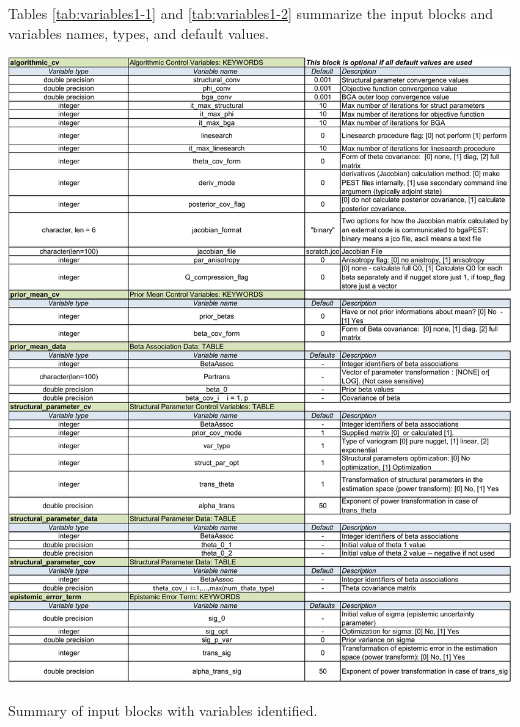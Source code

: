 \documentclass[11pt,oneside,onecolumn]{usgsreport}
\begin{document}
\begin{appendix}
\begin{bibunit}
Tables \ref{tab:variables1-1} and \ref{tab:variables1-2} summarize the input blocks and variables
names, types, and default values.

\begin{table}[!t]
\begin{center}\includegraphics[scale=0.5]{Variables_for_documentation1}\end{center}

\caption{\label{tab:variables1-1}Summary of input blocks with variables identified.}
\end{table}



\end{bibunit}
\end{appendix}
\end{document}
